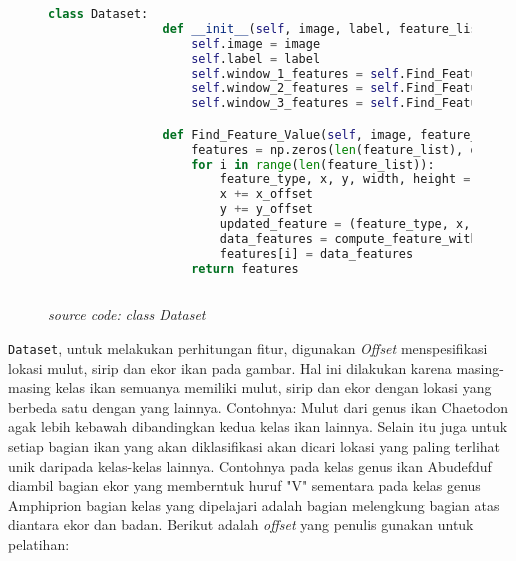 	\begin{figure}[H]
		\begin{lstlisting}[language=Python, basicstyle=\tiny]
			class Dataset:
				def __init__(self, image, label, feature_list):
					self.image = image
					self.label = label
					self.window_1_features = self.Find_Feature_Value(image, feature_list, self.class_Window_offset_1[label][0], self.class_Window_offset_1[label][1])
					self.window_2_features = self.Find_Feature_Value(image, feature_list, self.class_Window_offset_2[label][0], self.class_Window_offset_2[label][1])
					self.window_3_features = self.Find_Feature_Value(image, feature_list, self.class_Window_offset_3[label][0], self.class_Window_offset_3[label][1])

				def Find_Feature_Value(self, image, feature_list, x_offset, y_offset):
					features = np.zeros(len(feature_list), dtype=object)
					for i in range(len(feature_list)):
						feature_type, x, y, width, height = feature_list[i]
						x += x_offset
						y += y_offset
						updated_feature = (feature_type, x, y, width, height)
						data_features = compute_feature_with_matrix(image, 0, updated_feature)
						features[i] = data_features
					return features
				
		\end{lstlisting}
		\caption{\emph{source code:} \textit{class Dataset}}
		\label{code:Dataset class}
	\end{figure}

	\texttt{Dataset}, untuk melakukan perhitungan fitur, digunakan \textit{Offset} 
	menspesifikasi lokasi mulut, sirip dan ekor ikan pada gambar. Hal ini dilakukan 
	karena masing-masing kelas ikan semuanya memiliki 
	mulut, sirip dan ekor dengan lokasi yang berbeda satu dengan yang lainnya. Contohnya: Mulut dari genus ikan Chaetodon 
	agak lebih kebawah dibandingkan kedua kelas ikan lainnya. Selain itu juga untuk setiap bagian 
	ikan yang akan diklasifikasi akan dicari lokasi yang paling terlihat unik daripada kelas-kelas lainnya. Contohnya 
	pada kelas genus ikan Abudefduf diambil bagian ekor yang memberntuk huruf "V" 
	sementara pada kelas genus Amphiprion bagian kelas yang dipelajari adalah 
	bagian melengkung bagian atas diantara ekor dan badan. Berikut adalah 
	\textit{offset} yang penulis gunakan untuk pelatihan:

